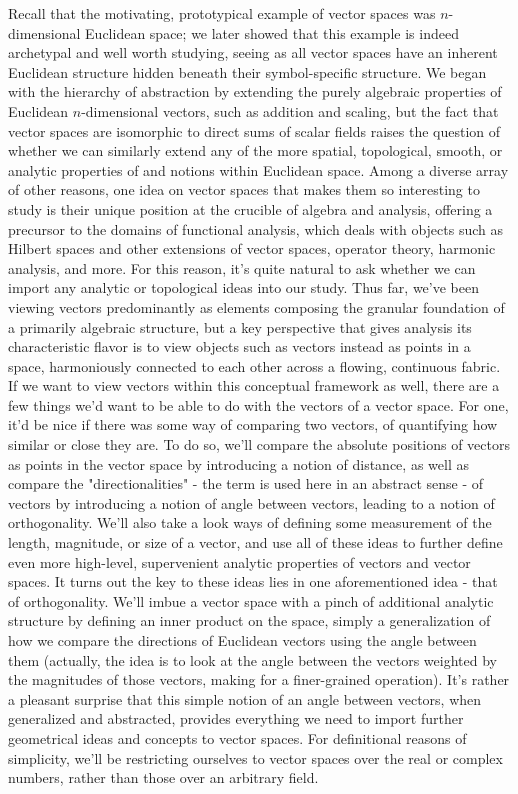 \documentclass{article}
\newcommand{\nn}{\leavevmode \newline \newline}
\begin{document}
Recall that the motivating, prototypical example of vector spaces was $ n $-dimensional Euclidean space; we later showed that this example is indeed archetypal and well worth studying, seeing as all vector spaces have an inherent Euclidean structure hidden beneath their symbol-specific structure. We began with the hierarchy of abstraction by extending the purely algebraic properties of Euclidean $ n $-dimensional vectors, such as addition and scaling, but the fact that vector spaces are isomorphic to direct sums of scalar fields raises the question of whether we can similarly extend any of the more spatial, topological, smooth, or analytic properties of and notions within Euclidean space. Among a diverse array of other reasons, one idea on vector spaces that makes them so interesting to study is their unique position at the crucible of algebra and analysis, offering a precursor to the domains of functional analysis, which deals with objects such as Hilbert spaces and other extensions of vector spaces, operator theory, harmonic analysis, and more. For this reason, it's quite natural to ask whether we can import any analytic or topological ideas into our study.
\nn
Thus far, we've been viewing vectors predominantly as elements composing the granular foundation of a primarily algebraic structure, but a key perspective that gives analysis its characteristic flavor is to view objects such as vectors instead as points in a space, harmoniously connected to each other across a flowing, continuous fabric. If we want to view vectors within this conceptual framework as well, there are a few things we'd want to be able to do with the vectors of a vector space. For one, it'd be nice if there was some way of comparing two vectors, of quantifying how similar or close they are. To do so, we'll compare the absolute positions of vectors as points in the vector space by introducing a notion of distance, as well as compare the "directionalities" - the term is used here in an abstract sense - of vectors by introducing a notion of angle between vectors, leading to a notion of orthogonality. We'll also take a look ways of defining some measurement of the length, magnitude, or size of a vector, and use all of these ideas to further define even more high-level, supervenient analytic properties of vectors and vector spaces.
\nn
It turns out the key to these ideas lies in one aforementioned idea - that of orthogonality. We'll imbue a vector space with a pinch of additional analytic structure by defining an inner product on the space, simply a generalization of how we compare the directions of Euclidean vectors using the angle between them (actually, the idea is to look at the angle between the vectors weighted by the magnitudes of those vectors, making for a finer-grained operation). It's rather a pleasant surprise that this simple notion of an angle between vectors, when generalized and abstracted, provides everything we need to import further geometrical ideas and concepts to vector spaces. For definitional reasons of simplicity, we'll be restricting ourselves to vector spaces over the real or complex numbers, rather than those over an arbitrary field.
\end{document}

